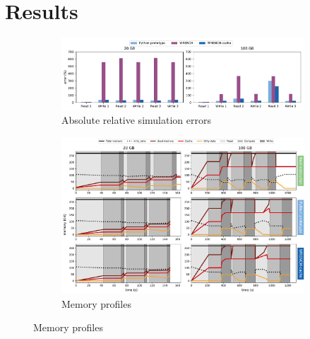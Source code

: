 \chapter{Results}
\label{results}

\begin{figure}
    \centering
    \begin{subfigure}{\linewidth}
        \centering
           \includegraphics[width=\linewidth]{result/single/figures/single_errors.pdf}
           \vspace*{-0.7cm}
           \caption{Absolute relative simulation errors}
           \vspace*{0.5cm}
           \label{fig:single_error}
        \end{subfigure}
    \begin{subfigure}{\linewidth}
        \centering
           \includegraphics[width=\linewidth]{result/single/figures/single_memprof.pdf}
           \vspace*{-0.7cm}
           \caption{Memory profiles}
           \vspace*{0.5cm}
           \label{fig:single_memprof}
    \end{subfigure}

\end{figure}

